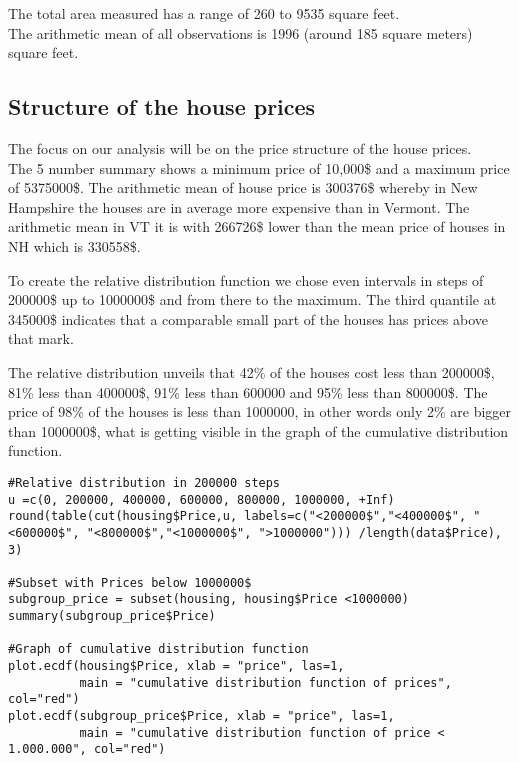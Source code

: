 The total area measured has a range of 260 to 9535 square feet.\\
The arithmetic mean of all observations is 1996 (around 185 square meters) square feet.\\

\subsection{Structure of the house prices}
The focus on our analysis will be on the price structure of the house prices. \\

The 5 number summary shows a minimum price of 10,000\$ and a maximum price of 5375000\$. The arithmetic mean of house price is 300376\$ whereby in New Hampshire the houses are in average more expensive than in Vermont.
The arithmetic mean in VT it is with 266726\$ lower than the mean price of houses in NH which is 330558\$.

To create the relative distribution function we chose even intervals in steps of 200000\$ up to 1000000\$ and from there to the maximum. The third quantile at 345000\$ indicates that a comparable small part of the houses has prices above that mark.

The relative distribution unveils that 42\% of the houses cost less than 200000\$, 81\% less than 400000\$, 91\% less than 600000  and 95\% less than 800000\$. The price of 98\% of the houses is less than 1000000, in other words only 2\% are bigger than 1000000\$, what is getting visible in the graph of the cumulative distribution function. \\

\begin{lstlisting}[frame = single,backgroundcolor=\color{hellgelb}]
 #Relative distribution in 200000 steps 
u =c(0, 200000, 400000, 600000, 800000, 1000000, +Inf)
round(table(cut(housing$Price,u, labels=c("<200000$","<400000$", "<600000$", "<800000$","<1000000$", ">1000000"))) /length(data$Price), 3)

#Subset with Prices below 1000000$
subgroup_price = subset(housing, housing$Price <1000000)
summary(subgroup_price$Price)

#Graph of cumulative distribution function 
plot.ecdf(housing$Price, xlab = "price", las=1,
          main = "cumulative distribution function of prices", col="red") 
plot.ecdf(subgroup_price$Price, xlab = "price", las=1,
          main = "cumulative distribution function of price < 1.000.000", col="red") 
\end{lstlisting}

